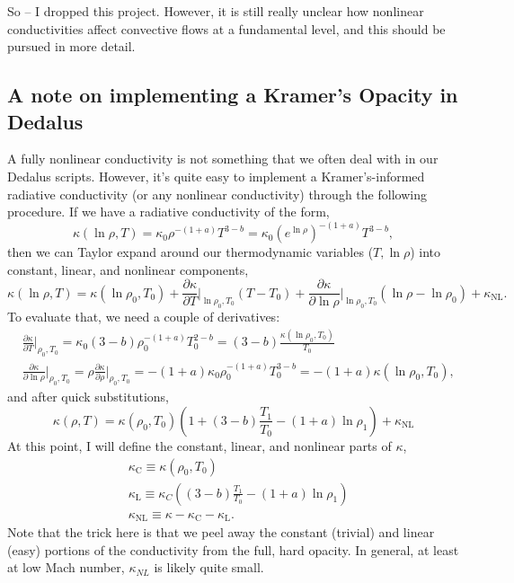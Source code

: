 So -- I dropped this project.
However, it is still really unclear how nonlinear conductivities affect convective flows at a fundamental level, and this should be pursued in more detail.

\subsection{A note on implementing a Kramer's Opacity in Dedalus}
A fully nonlinear conductivity is not something that we often deal with in our Dedalus scripts.
However, it's quite easy to implement a Kramer's-informed radiative conductivity (or any nonlinear conductivity) through the following procedure.
If we have a radiative conductivity of the form,
\begin{equation}
\kappa(\ln\rho, T) = \kappa_0 \rho^{-(1 + a)} T^{3 - b}
= \kappa_0 \left(e^{\ln\rho}\right)^{-(1 + a)} T^{3 - b},
\end{equation}
then we can Taylor expand around our thermodynamic variables ($T, \ln\rho$) into constant, linear, and nonlinear components,
\begin{equation}
\kappa(\ln\rho, T) = \kappa(\ln\rho_0, T_0) 
+ \frac{\partial \kappa}{\partial T}\bigg|_{\ln\rho_0, T_0}(T - T_0)
+ \frac{\partial \kappa}{\partial \ln\rho}\bigg|_{\ln\rho_0, T_0}(\ln\rho - \ln\rho_0)
+ \kappa_{\text{NL}}.
\end{equation}
To evaluate that, we need a couple of derivatives:
\begin{equation}
\begin{split}
&\frac{\partial \kappa}{\partial T}\bigg|_{\rho_0, T_0} = 
\kappa_0(3-b)\rho_0^{-(1+a)}T_0^{2-b} = (3-b)\frac{\kappa(\ln\rho_0, T_0)}{T_0} \\
&\frac{\partial \kappa}{\partial \ln\rho}\bigg|_{\rho_0, T_0} =
\rho\frac{\partial \kappa}{\partial \rho}\bigg|_{\rho_0, T_0} =
-(1+a)\kappa_0 \rho_0^{-(1+a)} T_0^{3-b} = -(1+a)\kappa(\ln\rho_0, T_0),
\end{split}
\end{equation}
and after quick substitutions,
\begin{equation}
\kappa(\rho, T) = \kappa(\rho_0, T_0)\left( 1 +
(3 - b)\frac{T_1}{T_0} - (1 + a) \ln\rho_1 \right)
+ \kappa_{\text{NL}}
\end{equation}
At this point, I will define the constant, linear, and nonlinear parts of $\kappa$,
\begin{equation}
\begin{split}
&\kappa_\text{C} \equiv \kappa(\rho_0, T_0) \\
&\kappa_\text{L} \equiv \kappa_C\left(
(3 - b)\frac{T_1}{T_0} - (1 + a) \ln\rho_1 \right) \\
&\kappa_{\text{NL}} \equiv \kappa - \kappa_\text{C} - \kappa_{\text{L}}.
\end{split}
\end{equation}
Note that the trick here is that we peel away the constant (trivial) and linear (easy) portions of the conductivity from the full, hard opacity.
In general, at least at low Mach number, $\kappa_{NL}$ is likely quite small.

